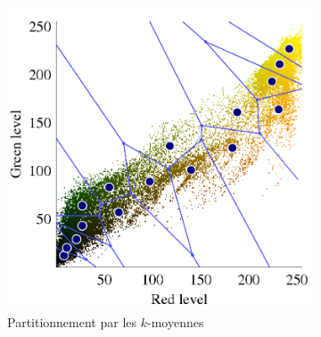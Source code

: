 \begin{figure}
    \centering
    \begin{subfigure}[b]{0.45\textwidth}
        \includegraphics[width=\textwidth]{img/kmeans_voronoi.png}
        \caption{Partitionnement par les \(k\)-moyennes}
    \end{subfigure}
    \begin{subfigure}[b]{0.45\textwidth}

\end{subfigure}
\end{figure}
